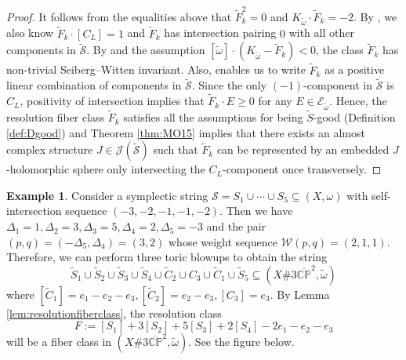 \documentclass[11pt]{article}
\theoremstyle{definition}
\newtheorem{example}[theorem]{Example}
\theoremstyle{remark}
\newcommand{\CP}{\mathbb{CP}}
\newcommand{\st}{\mathcal{S}}
\begin{document}
\begin{proof}
 It follows from the equalities above that $\tilde{F}_k^2=0$ and $K_{\tilde{\omega}}\cdot \tilde{F}_k=-2$. By \cite[Lemma 4.1.3]{McduffSiegel}, we also know $\tilde{F}_k\cdot [C_L]=1$ and $\tilde{F}_k$ has intersection pairing $0$ with all other components in $\tilde{\st}$. By \cite[Corollary 2.8]{LN25} and the assumption $[\tilde{\omega}]\cdot(K_{\tilde{\omega}}-\tilde{F}_k)<0$, the class $\tilde{F}_k$ has non-trivial Seiberg--Witten invariant. Also, \cite[Lemma 3.2]{LN25} enables us to write $\tilde{F}_k$ as a positive linear combination of components in $\tilde{\st}$. Since the only $(-1)$-component in $\tilde{\st}$ is $C_L$, positivity of intersection implies that $\tilde{F}_k\cdot E\geq 0$ for any $E\in \mathcal{E}_{\tilde{\omega}}$. Hence, the resolution fiber class $\tilde{F}_k$ satisfies all the assumptions for being $\tilde{S}$-good (Definition \ref{def:Dgood}) and Theorem \ref{thm:MO15} implies that there exists an almost complex structure $J\in \mathcal{J}(\tilde{\st})$ such that $\tilde{F}_k$ can be represented by an embedded $J$-holomorphic sphere only intersecting the $C_L$-component once transversely.
\end{proof}

\begin{example}
  Consider a symplectic string $\st=S_1\cup \cdots\cup S_5\subseteq (X,\omega)$ with self-intersection sequence $(-3,-2,-1,-1,-2)$. Then we have $\Delta_1=1,\Delta_2=3,\Delta_3=5,\Delta_4=2,\Delta_5=-3$ and the pair $(p,q)=(-\Delta_5,\Delta_4)=(3,2)$ whose weight sequence $\mathcal{W}(p,q)=(2,1,1)$. Therefore, we can perform three toric blowups to obtain the string \[\tilde{S}_1\cup\tilde{S}_2\cup\tilde{S}_3\cup\tilde{S}_4\cup \tilde{C}_2\cup C_3\cup \tilde{C}_1 \cup \tilde{S}_5\subseteq (X\#3\overline{\CP}^2,\tilde{\omega})\] where $[\tilde{C}_1]=e_1-e_2-e_3,[\tilde{C}_2]=e_2-e_3,[C_3]=e_3$. By Lemma \ref{lem:resolutionfiberclass}, the resolution class \[F:=[S_1]+3[S_2]+5[S_3]+2[S_4]-2e_1-e_2-e_3\] will be a fiber class in $(X\#3\overline{\CP}^2,\tilde{\omega})$. See the figure below.
\end{example}
\end{document}
